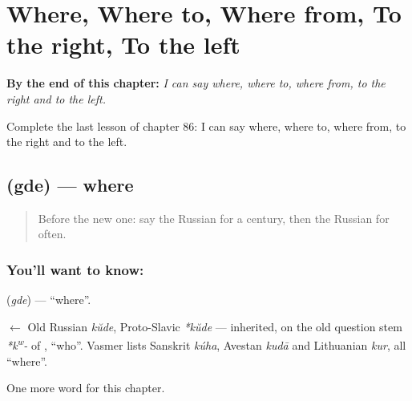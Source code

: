 
\chapter{Where, Where to, Where from, To the right, To the left}
\label{ch:ru-where-where-to-where-from-to-the-right-to-the-left}

\begin{chapteropening}
\textbf{By the end of this chapter:} \emph{I can say where, where to, where from, to the right and to the left.}

Complete the last lesson of chapter 86: I can say where, where to, where from, to the right and to the left.
\end{chapteropening}

\section[\texorpdfstring{\ru{где} (gde)}{где (gde)}]{ (gde) — where}

\label{lesson:RU-C86-where}



\begin{quote}
Before the new one: say the Russian for a century, then the Russian for often.
\end{quote}

\subsection*{You'll want to know: }
\textbf{} (\emph{gde}) — \textquotedblleft{}where\textquotedblright{}.

\begin{cousinweb}
\textbf{} $\leftarrow$ Old Russian \emph{kŭde}, Proto-Slavic \emph{*kŭde} — inherited, on the old question stem \emph{*k\textsuperscript{w}-} of \emph{}, \textquotedblleft{}who\textquotedblright{}. Vasmer lists Sanskrit \emph{kúha}, Avestan \emph{kudā} and Lithuanian \emph{kur}, all \textquotedblleft{}where\textquotedblright{}.
\end{cousinweb}

\begin{grammarlens}[title={What you've built}]
One more word for this chapter.
\end{grammarlens}


